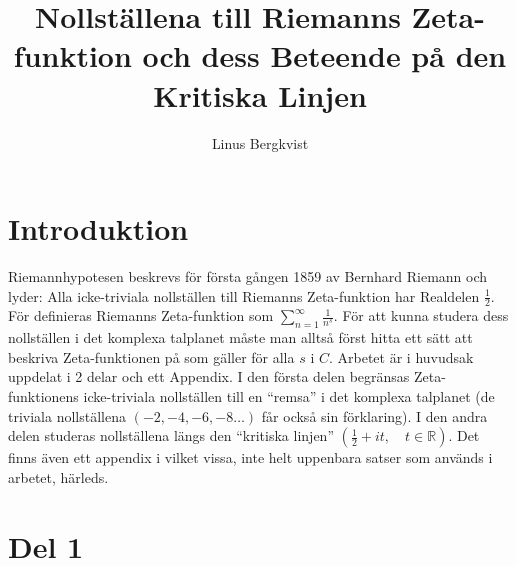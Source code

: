 \documentclass[a4paper,twoside]{article}%
\begin{document}
\title{Nollställena till Riemanns Zeta-funktion och dess Beteende på den Kritiska Linjen}
\author{Linus Bergkvist}
\date{}
\maketitle

\pagebreak
\section*{Introduktion}
Riemannhypotesen beskrevs för första gången 1859 av Bernhard Riemann och lyder:
Alla icke-triviala nollställen till Riemanns Zeta-funktion har Realdelen $\frac 1 2$.
För  definieras Riemanns Zeta-funktion som $\sum\limits_{n = 1}^\infty \frac 1 {n^s}$. 
För att kunna studera dess nollställen i det komplexa talplanet måste man alltså först hitta
ett sätt att beskriva Zeta-funktionen på som gäller för alla $s$ i $C$. 
Arbetet är i huvudsak uppdelat i 2 delar och ett Appendix. I den första delen begränsas 
Zeta-funktionens icke-triviala nollställen till en ``remsa'' i det komplexa talplanet 
(de triviala nollställena $(-2, -4, -6, -8\ldots)$ får också sin förklaring). 
I den andra delen studeras nollställena längs den ``kritiska linjen'' $(\frac 1 2 + it,\quad t \in \mathbb{R})$.
Det finns även ett appendix i vilket vissa, inte helt uppenbara satser som används i arbetet, härleds.

\section*{Del 1}
\end{document}
